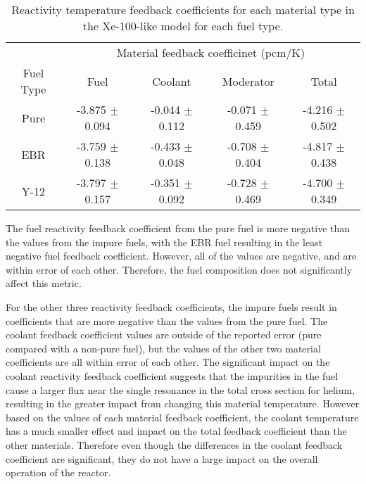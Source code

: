 \begin{table}[ht]
        \centering
        \caption{Reactivity temperature feedback coefficients for 
        each material type in the Xe-100-like model for each fuel 
        type.}
        \label{tab:coeff_xe100}
        \begin{tabular}{c c c c c}
            \hline 
            & \multicolumn{4}{c}{Material feedback coefficinet (pcm/K)} \\
            Fuel Type & Fuel & Coolant & Moderator & Total \\
            \hline
            Pure & -3.875 $\pm$ 0.094 & -0.044 $\pm$ 0.112 & -0.071 $\pm$ 0.459 & -4.216 $\pm$ 0.502\\
            \gls{EBR} & -3.759 $\pm$ 0.138 & -0.433 $\pm$ 0.048 & -0.708 $\pm$ 0.404 & -4.817 $\pm$ 0.438\\
            Y-12 & -3.797 $\pm$ 0.157 & -0.351 $\pm$ 0.092 & -0.728 $\pm$ 0.469 & -4.700 $\pm$ 0.349\\
            \hline

        \end{tabular}
\end{table}

The fuel reactivity feedback coefficient from the pure fuel is more 
negative than the values from the impure fuels, with the \gls{EBR} fuel resulting 
in the least negative fuel feedback coefficient. However, all of 
the values are negative, and are within error of each other. Therefore, 
the fuel composition does not significantly affect this metric. 

For the other three reactivity feedback coefficients, the impure fuels 
result in coefficients that are more negative than the values from 
the pure fuel. The coolant feedback coefficient values are outside 
of the reported error (pure compared with a non-pure fuel), but the 
values of the other two material coefficients are all within error of 
each other. The significant impact on the coolant reactivity feedback 
coefficient suggests that the impurities in the fuel cause a larger 
flux near the single resonance in the total cross section for helium,
resulting in the greater impact from changing this material temperature. 
However based on the values of each material feedback coefficient, 
the coolant temperature has a much smaller effect and impact on the 
total feedback coefficient than the other materials. Therefore even 
though the differences in the coolant feedback coefficient are significant,
they do not have a large impact on the overall operation of the reactor. 


